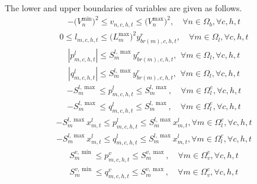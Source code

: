 \documentclass[a4paper,fleqn]{cas-dc}
\begin{document}
{The lower and upper boundaries of variables are given as follows.
\begin{align}
    \label{v_bound}
    - \bigl( V_{n}^{\min} \bigr)^{2} 
    \leq v_{n,c,h,t} 
    \leq \bigl( V_{n}^{\max} \bigr)^{2},
    \quad \forall n \in \Omega_{b}, \forall c,h,t
\end{align}
\begin{align}
    \label{i_bound}
    0
    \leq l_{m,c,h,t} 
    \leq \bigl( L_{m}^{\max} \bigr)^{2} y_{br(m),c,h,t}^{r},
    \quad \forall m \in \Omega_{l}, \forall c,h,t
\end{align}
\begin{align}
    \label{p_line_onoff}
    \left| p_{m,c,h,t}^{l} \right| \leq S_{m}^{l, \max} y_{br(m),c,h,t}^{r},
    \ \, \forall m \in \Omega_{l}, 
    \forall c,h,t
\end{align}
\begin{align}
    \label{q_line_onoff}
    \left| q_{m,c,h,t}^{l} \right| \leq S_{m}^{l, \max} y_{br(m),c,h,t}^{r},
    \ \, \forall m \in \Omega_{l}, 
    \forall c,h,t
\end{align}
\begin{align}
    \label{p_line_ext}
    -S_{m}^{l, \max} \leq p_{m,c,h,t}^{l} \leq S_{m}^{l, \max},
    \quad \forall m \in \Omega_{l}^{e}, \forall c,h,t
\end{align}
\begin{align}
    \label{q_line_ext}
    -S_{m}^{l, \max} \leq q_{m,c,h,t}^{l} \leq S_{m}^{l, \max},
    \quad \forall m \in \Omega_{l}^{e}, \forall c,h,t
\end{align}
\begin{align}
    \label{p_line_cdd}
    -S_{m}^{l, \max} x_{m,t}^{l} \leq p_{m,c,h,t}^{l} \leq S_{m}^{l, \max} x_{m,t}^{l},
    \forall m \in \Omega_{l}^{c}, \forall c,h,t
\end{align}
\begin{align}
    \label{q_line_cdd}
    -S_{m}^{l, \max} x_{m,t}^{l} \leq q_{m,c,h,t}^{l} \leq S_{m}^{l, \max} x_{m,t}^{l},
    \forall m \in \Omega_{l}^{c}, \forall c,h,t
\end{align}
\begin{align}
    \label{p_VSC_ext}
    S_{m}^{v, \min} \leq p_{m,c,h,t}^{v} \leq S_{m}^{v, \max},
    \quad \forall m \in \Omega_{v}^{e}, \forall c,h,t
\end{align}
\begin{align}
    \label{q_VSC_ext}
    S_{m}^{v, \min} \leq q_{m,c,h,t}^{v} \leq S_{m}^{v, \max},
    \quad \forall m \in \Omega_{v}^{e}, \forall c,h,t
\end{align}
}
\end{document}
